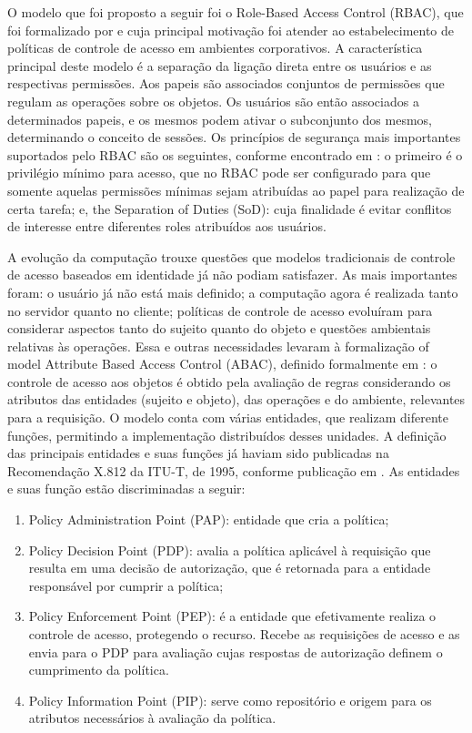 \documentclass{doublecol-new}
\begin{document}
O modelo que foi proposto a seguir foi o Role-Based Access Control (RBAC), que foi formalizado por \cite{ferraiolo1992role} e cuja principal motivação foi atender ao estabelecimento de políticas de controle de acesso em ambientes corporativos. A característica principal deste modelo é a separação da ligação direta entre os usuários e as respectivas permissões. Aos papeis são associados conjuntos de permissões que regulam as operações sobre os objetos. Os usuários são então associados a determinados papeis, e os mesmos podem ativar o subconjunto dos mesmos, determinando o conceito de sessões. Os princípios de segurança mais importantes suportados pelo RBAC são os seguintes, conforme encontrado em \cite{sandhu1996role}: o primeiro é o privilégio mínimo para acesso, que no RBAC pode ser configurado para que somente aquelas permissões mínimas sejam atribuídas ao papel para realização de certa tarefa; e, the Separation of Duties (SoD): cuja finalidade é evitar conflitos de interesse entre diferentes roles atribuídos aos usuários.

A evolução da computação trouxe questões que modelos tradicionais de controle de acesso baseados em identidade já não podiam satisfazer. As mais importantes foram: o usuário já não está mais definido; a computação agora é realizada tanto no servidor quanto no cliente; políticas de controle de acesso evoluíram para considerar aspectos tanto do sujeito quanto do objeto e questões ambientais relativas às operações. Essa e outras necessidades levaram à formalização of model Attribute Based Access Control (ABAC), definido formalmente em \cite{huABAC2014guide}: o controle de acesso aos objetos é obtido pela avaliação de regras considerando os atributos das entidades (sujeito e objeto), das operações e do ambiente, relevantes para a requisição. O modelo conta com várias entidades, que realizam diferente funções, permitindo a implementação distribuídos desses unidades. A definição das principais entidades e suas funções já haviam sido publicadas na Recomendação X.812 da ITU-T, de 1995, conforme publicação em \cite{itut1996acframework}. As entidades e suas função estão discriminadas a seguir:

\begin{enumerate}
	\item Policy Administration Point (PAP): entidade que cria a política;
	\item Policy Decision Point (PDP): avalia a política aplicável à requisição que resulta em uma decisão de autorização, que é retornada para a entidade responsável por cumprir a política;
	\item Policy Enforcement Point (PEP): é a entidade que efetivamente realiza o controle de acesso, protegendo o recurso. Recebe as requisições de acesso e as envia para o PDP para avaliação cujas respostas de autorização definem o cumprimento da política.
	\item Policy Information Point (PIP): serve como repositório e origem para os atributos necessários à avaliação da política.
\end{enumerate}
\end{document}
